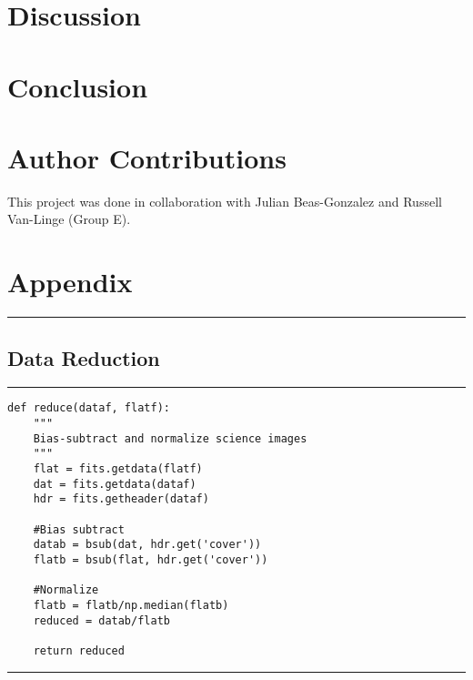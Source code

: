 \documentclass[preprint]{aastex62}
\begin{document}
\section{Discussion} \label{sec:discussion}


\section{Conclusion}


\section{Author Contributions}
This project was done in collaboration with Julian Beas-Gonzalez and Russell Van-Linge (Group
E).


\newpage
\section{Appendix}


\vspace{7pt} \hrule \vspace{7pt}
\subsection{Data Reduction} \label{code:reduction}
\small
\hrule
\begin{lstlisting}
def reduce(dataf, flatf):
    """
    Bias-subtract and normalize science images
    """  
    flat = fits.getdata(flatf)
    dat = fits.getdata(dataf)
    hdr = fits.getheader(dataf)

    #Bias subtract
    datab = bsub(dat, hdr.get('cover')) 
    flatb = bsub(flat, hdr.get('cover')) 
    
    #Normalize
    flatb = flatb/np.median(flatb)
    reduced = datab/flatb
    
    return reduced
\end{lstlisting}
\hrule \vspace{7pt}
\end{document}
